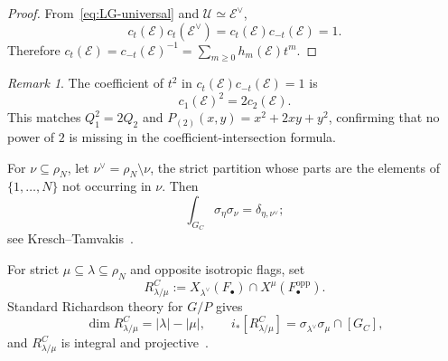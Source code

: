 \documentclass[11pt,a4paper,oneside]{amsart}
\numberwithin{equation}{section}
\theoremstyle{definition}
\theoremstyle{remark}
\newtheorem{remark}[theorem]{Remark}
\newcommand{\cE}{\mathcal E}
\newcommand{\cU}{\mathcal U}
\begin{document}
\begin{proof}
From~\eqref{eq:LG-universal} and $\cU\simeq\cE^\vee$,
\[
 c_t(\cE)c_t(\cE^\vee)=c_t(\cE)c_{-t}(\cE)=1.
\]
Therefore $c_t(\cE)=c_{-t}(\cE)^{-1}=\sum_{m\geq0} h_m(\cE)t^m$.
\end{proof}

\begin{remark}
The coefficient of $t^2$ in $c_t(\cE)c_{-t}(\cE)=1$ is
\[
 c_1(\cE)^2=2c_2(\cE).
\]
This matches $Q_1^2=2Q_2$ and
$P_{(2)}(x,y)=x^2+2xy+y^2$, confirming that no power of $2$ is missing in the coefficient-intersection formula.
\end{remark}

For $\nu\subseteq\rho_N$, let $\nu^\vee=\rho_N\setminus\nu$, the strict partition whose parts are the elements of $\{1,\ldots,N\}$ not occurring in $\nu$.  Then
\begin{equation}\label{eq:LG-duality}
 \int_{G_C}\sigma_\eta\sigma_\nu=\delta_{\eta,\nu^\vee};
\end{equation}
see Kresch--Tamvakis~\cite[Section~3.1, equation~(36)]{KT03}.

For strict $\mu\subseteq\lambda\subseteq\rho_N$ and opposite isotropic flags, set
\begin{equation}\label{eq:typeC-Richardson}
 R^C_{\lambda/\mu}
 :=X_{\lambda^\vee}(F_\bullet)
 \cap X^\mu(F_\bullet^{\mathrm{opp}}).
\end{equation}
Standard Richardson theory for $G/P$ gives
\begin{equation}\label{eq:typeC-Richardson-class}
 \dim R^C_{\lambda/\mu}=|\lambda|-|\mu|,
 \qquad
 i_*[R^C_{\lambda/\mu}]
 =\sigma_{\lambda^\vee}\sigma_\mu\cap[G_C],
\end{equation}
and $R^C_{\lambda/\mu}$ is integral and projective~\cite[Section~1.3]{Brion05}.
\end{document}
